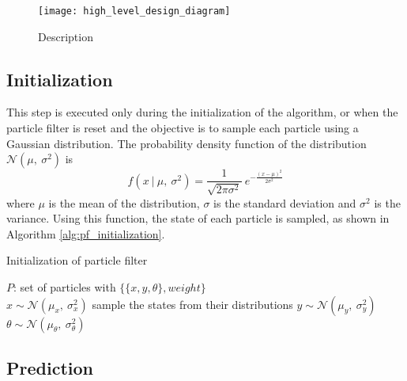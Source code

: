 \begin{figure}
    \centering
    \texttt{[image: high\_level\_design\_diagram]}
    \decoRule
    \caption[Name]{
        Description
    }
    \label{fig:pose_estimation_activity_diagram}
\end{figure}

\subsection{Initialization}

This step is executed only during the initialization of the algorithm,
or when the particle filter is reset and the objective is to sample
each particle using a Gaussian distribution.
The probability density function of the distribution
$\mathcal{N}(\mu, \ \sigma^2)$ is
\begin{equation}
    f(x \ | \ \mu ,\ \sigma^2) =
    \frac{1}{\sqrt{2\pi\sigma^2}} \
    e^{ -\frac{(x-\mu)^2}{2\sigma^2} }
\end{equation}
where
$\mu$ is the mean of the distribution,
$\sigma$ is the standard deviation and
$\sigma^2$ is the variance.
Using this function, the state of each particle is sampled, as shown in
Algorithm \ref{alg:pf_initialization}.

\begin{algorithm}
    \caption{Initialization of particle filter}
    \label{alg:pf_initialization}
    \begin{algorithmic}[1]
        \State $P$: set of particles with $\{\{x, y, \theta\}, weight\}$ \\

            \State $x \sim \mathcal{N}(\mu_x, \ \sigma^2_x)$
            \Comment sample the states from their distributions
            \State $y \sim \mathcal{N}(\mu_y, \ \sigma^2_y)$
            \State $\theta \sim \mathcal{N}(\mu_\theta, \ \sigma^2_\theta)$
        \EndFor
    \end{algorithmic}
\end{algorithm}

\subsection{Prediction} \label{pf_prediction}


